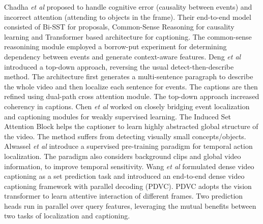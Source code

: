 \par Chadha \textit{et al} \cite{chadha2020iperceive} proposed to handle cognitive error (causality between events) and incorrect attention (attending to objects in the frame). Their end-to-end model consisted of Bi-SST for proposals, Common-Sense Reasoning for causality learning and Transformer based architecture \cite{iashin2020multimodal} for captioning. The common-sense reasonining module employed a borrow-put experiment for determining dependency between events and generate context-aware features. Deng \textit{et al} \cite{deng2021sketch} introduced a top-down approach, reversing the usual detect-then-describe method. The architecture first generates a multi-sentence paragraph to describe the whole video and then localize each sentence for events. The captions are then refined using dual-path cross attention module. The top-down approach increased coherency in captions. Chen \textit{et al} \cite{chen2021towards} worked on closely bridging event localization and captioning modules for weakly supervised learning. The Induced Set Attention Block helps the captioner to learn highly abstracted global structure of the video. The method suffers from detecting visually small concepts/objects. Alwassel \textit{et al} \cite{alwassel2021tsp} introduce a supervised pre-training  paradigm for temporal action localization. The paradigm also considers background clips and global video information, to improve temporal sensitivity. Wang \textit{et al} \cite{wang2021endtoend} formulated dense video captioning as a set prediction task and introduced an end-to-end dense video captioning framework with parallel decoding (PDVC). PDVC adopts the vision transformer to learn attentive interaction of different frames. Two prediction heads run in parallel over query features, leveraging the mutual benefits between two tasks of localization and captioning.

